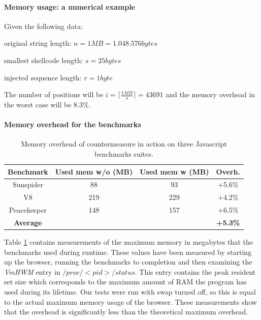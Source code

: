 \paragraph{Memory usage: a numerical example}

Given the following data:
\begin{description}
\item original string length:  $n = 1 MB = 1.048.576 bytes$ 
\item smallest shellcode length: $s = 25 bytes$ 
\item injected sequence length:  $r = 1  byte$ 
\end{description}

The number of positions will be $i= \lceil \frac{1MB}{s} \rceil= 43691$ and the memory overhead in the worst case will be $8.3\% $. 

\paragraph{Memory overhead for the benchmarks}
\begin{table}[htdp]
\begin{center}
\begin{tabular}{|c|c|c|c|}
\hline
\bf{Benchmark} & \bf{Used mem w/o (MB)} & \bf{Used mem w (MB)}  & \bf{Overh.} \\
\hline
Sunspider   &    88      &    93      &  +5.6\% \\
V8          &    219     &    229     &  +4.2\% \\
Peacekeeper &    148     &    157     &  +6.5\% \\
\hline
\bf{Average}  &   &   & \bf{+5.3\%} \\
\hline
\end{tabular}
\end{center}
\caption{{ Memory overhead of countermeasure in action on three Javascript benchmarks suites.}}
\vspace{0.3cm}
\label{memory}
\end{table}


Table \ref{memory} contains measurements of the maximum memory in megabytes that the benchmarks used during  runtime. These values have been measured by starting up the browser, running the benchmarks to completion and then examining the \emph{VmHWM} entry in $/proc/<pid>/status$.
This entry contains the peak resident set size which corresponds to the maximum amount of RAM the program has used during its lifetime. Our tests were run with swap turned off, so this is equal to the actual maximum memory usage of the browser. These measurements show that the overhead  is significantly less than the theoretical maximum overhead.

